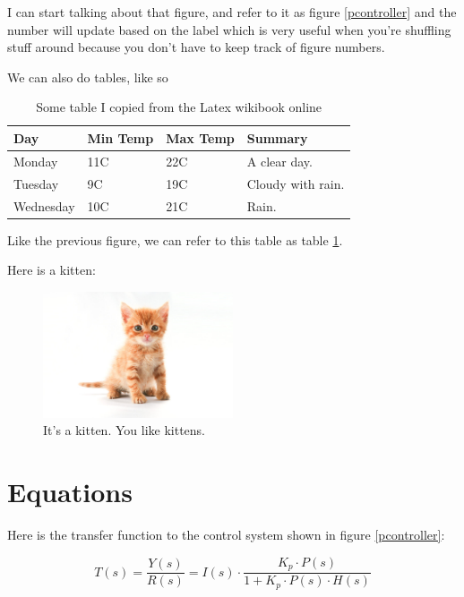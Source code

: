 \documentclass[12pt]{article}
\begin{document}
	I can start talking about that figure, and refer to it as figure \ref{pcontroller} and the number will update based on the label which is very useful when you're shuffling stuff around because you don't have to keep track of figure numbers.

	We can also do tables, like so

	\begin{center}
		\begin{table}[!ht]
		    \begin{tabular}{ | l | l | l | p{5cm} |}
		    \hline
		    Day & Min Temp & Max Temp & Summary \\ \hline
		    Monday & 11C & 22C & A clear day. \\ 	\hline
		    Tuesday & 9C & 19C & Cloudy with rain.\\ \hline
		    Wednesday & 10C & 21C & Rain. \\
		    \hline
		    \end{tabular}
			\caption{Some table I copied from the Latex wikibook online}
			\label{shittytable}
		\end{table}
	\end{center}

	Like the previous figure, we can refer to this table as table \ref{shittytable}.

	Here is a kitten:

    \begin{figure}[!ht]
        \label{kitten}
        \centering
        \includegraphics[width=0.5\textwidth]{kitten}
        \caption{It's a kitten. You like kittens.}
    \end{figure}

	\section{Equations}

	Here is the transfer function to the control system shown in figure \ref{pcontroller}:

    \begin{equation}
        \label{ptransfer}
        T(s)=\frac{Y(s)}{R(s)}=I(s) \cdot \frac{K_p \cdot P(s)}{1 + K_p \cdot P(s) \cdot H(s)}
    \end{equation}
\end{document}
